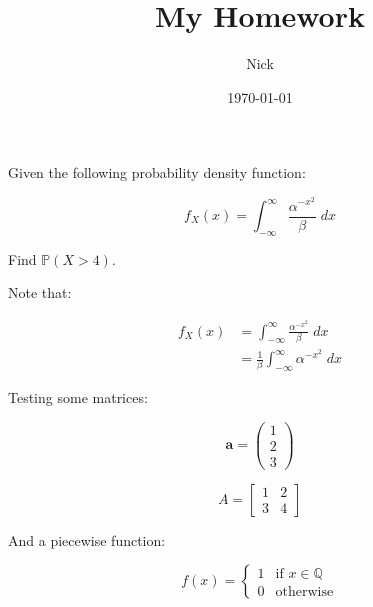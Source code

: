 \documentclass{article}
\title{My Homework}
\author{Nick}
\date{\today}
\begin{document}
\maketitle

Given the following probability density function:

\begin{equation}
    f_X(x)=\int^\infty_{-\infty}\frac{\alpha^{-x^2}}{\beta}\;dx
\end{equation}

Find $\mathbb{P}(X>4)$.

Note that:

\begin{align*}
    f_X(x) & = \int^\infty_{-\infty}\frac{\alpha^{-x^2}}{\beta}\;dx \\
           & = \frac{1}{\beta}\int^\infty_{-\infty}\alpha^{-x^2}\;dx
\end{align*}

Testing some matrices:

\[
    \mathbf{a} = \begin{pmatrix}
        1 \\
        2 \\
        3
    \end{pmatrix}
\]

\[
    A = \begin{bmatrix}
        1 & 2 \\
        3 & 4
    \end{bmatrix}
\]

And a piecewise function:

\[
    f(x)=\begin{cases}
        1 & \text{if }x\in\mathbb{Q} \\
        0 & \text{otherwise}
    \end{cases}
\]
\end{document}
